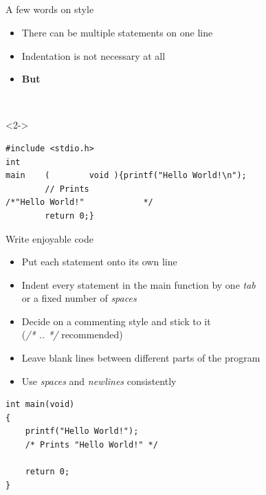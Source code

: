 \subsection{}
\begin{frame}[fragile]{A few words on style}
	\begin{itemize}
		\item There can be multiple statements on one line
		\item Indentation is not necessary at all
		\item \textbf{But \textellipsis}
	\end{itemize}
	\ \\
	\begin{uncoverenv}<2->
	\begin{lstlisting}
#include <stdio.h>
int
main	(        void ){printf("Hello World!\n");
		// Prints
/*"Hello World!"			*/
		return 0;}
\end{lstlisting}
	\end{uncoverenv}
\end{frame}
\begin{frame}[fragile]{Write enjoyable code}
	\begin{itemize}
		\item Put each statement onto its own line
		\item Indent every statement in the main function by one \textit{tab}\\
		 or a fixed number of \textit{spaces}
		\item Decide on a commenting style and stick to it\\
		(\textit{/* .. */} recommended)
		\item Leave blank lines between different parts of the program
		\item Use \textit{spaces} and \textit{newlines} consistently
	\end{itemize}
	\begin{lstlisting}[showspaces=true,showtabs=true]
int main(void)
{
	printf("Hello World!");
	/* Prints "Hello World!" */

	return 0;
}
\end{lstlisting}
\end{frame}



